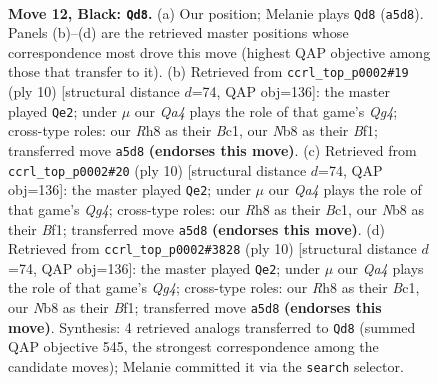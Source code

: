 \documentclass[11pt]{article}
\begin{document}
\clearpage

\begin{figure}[p]\centering
\begin{subfigure}{0.46\textwidth}\centering
\resizebox{\linewidth}{!}{%
\newchessgame
\chessboard[
  setfen={rnb1kb1r/p4ppp/2p1p3/q1ppP3/P2P1PPP/2P5/1P1N4/R1BQK1NR b KQq - 0 12},
  showmover=false,
  pgfstyle=straightmove, color=movearrow, markmove={a5-d8}
]}
\caption{}
\end{subfigure}\hfill
\begin{subfigure}{0.46\textwidth}\centering
\resizebox{\linewidth}{!}{%
\newchessgame
\chessboard[
  setfen={rnbqk1nr/pp3p1p/3bp1p1/2pp4/4P1Q1/3P2P1/PPPN1P1P/R1B1KBNR w KQkq - 0 6},
  showmover=false,
  pgfstyle=straightmove, color=movearrow, markmove={g4-e2}
]}
\caption{}
\end{subfigure}
\\[4pt]
\begin{subfigure}{0.46\textwidth}\centering
\resizebox{\linewidth}{!}{%
\newchessgame
\chessboard[
  setfen={rnbqk1nr/pp3p1p/3bp1p1/2pp4/4P1Q1/3P2P1/PPPN1P1P/R1B1KBNR w KQkq - 0 6},
  showmover=false,
  pgfstyle=straightmove, color=movearrow, markmove={g4-e2}
]}
\caption{}
\end{subfigure}\hfill
\begin{subfigure}{0.46\textwidth}\centering
\resizebox{\linewidth}{!}{%
\newchessgame
\chessboard[
  setfen={rnbqk1nr/pp3p1p/3bp1p1/2pp4/4P1Q1/3P2P1/PPPN1P1P/R1B1KBNR w KQkq - 0 6},
  showmover=false,
  pgfstyle=straightmove, color=movearrow, markmove={g4-e2}
]}
\caption{}
\end{subfigure}
\caption{\textbf{Move 12, Black: \texttt{Qd8}.} (a) Our position; Melanie plays \texttt{Qd8} (\texttt{a5d8}). Panels (b)--(d) are the retrieved master positions whose correspondence most drove this move (highest QAP objective among those that transfer to it). (b) Retrieved from \texttt{ccrl\_top\_p0002\#19} (ply 10) [structural distance $d$=74, QAP obj=136]: the master played \texttt{Qe2}; under $\mu$ our \emph{Qa4} plays the role of that game's \emph{Qg4}; cross-type roles: our \emph{R}h8 as their \emph{B}c1, our \emph{N}b8 as their \emph{B}f1; transferred move \texttt{a5d8} \textbf{(endorses this move)}. (c) Retrieved from \texttt{ccrl\_top\_p0002\#20} (ply 10) [structural distance $d$=74, QAP obj=136]: the master played \texttt{Qe2}; under $\mu$ our \emph{Qa4} plays the role of that game's \emph{Qg4}; cross-type roles: our \emph{R}h8 as their \emph{B}c1, our \emph{N}b8 as their \emph{B}f1; transferred move \texttt{a5d8} \textbf{(endorses this move)}. (d) Retrieved from \texttt{ccrl\_top\_p0002\#3828} (ply 10) [structural distance $d$=74, QAP obj=136]: the master played \texttt{Qe2}; under $\mu$ our \emph{Qa4} plays the role of that game's \emph{Qg4}; cross-type roles: our \emph{R}h8 as their \emph{B}c1, our \emph{N}b8 as their \emph{B}f1; transferred move \texttt{a5d8} \textbf{(endorses this move)}. Synthesis: 4 retrieved analogs transferred to \texttt{Qd8} (summed QAP objective 545, the strongest correspondence among the candidate moves); Melanie committed it via the \texttt{search} selector.}
\label{fig:thought-m23}
\end{figure}
\end{document}
